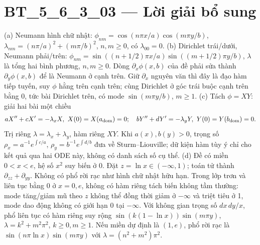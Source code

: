 \documentclass[10pt,a4paper]{article}
\begin{document}
\section*{BT\_5\_6\_3\_03 — Lời giải bổ sung}
(a) Neumann hình chữ nhật: $\phi_{nm}=\cos(n\pi x/a)\cos(m\pi y/b)$, $\lambda_{nm}=(n\pi/a)^2+(m\pi/b)^2$, $n,m\ge0$, có $\lambda_{00}=0$.
(b) Dirichlet trái/dưới, Neumann phải/trên: $\phi_{nm}=\sin((n+1/2)\pi x/a)\sin((m+1/2)\pi y/b)$, $\lambda$ là tổng hai bình phương, $n,m\ge0$. Dòng $\partial_x\phi(x,b)$ của đề phải sửa thành $\partial_y\phi(x,b)$ để là Neumann ở cạnh trên. Giữ $\partial_x$ nguyên văn thì đây là đạo hàm tiếp tuyến, suy $\phi$ hằng trên cạnh trên; cùng Dirichlet ở góc trái buộc cạnh trên bằng 0, tức bài Dirichlet trên, có mode $\sin(m\pi y/b)$, $m\ge1$.
(c) Tách $\phi=XY$: giải hai bài một chiều
\[aX''+cX'=-\lambda_xX,\ X(0)=X(a_{\rm dom})=0;\quad bY''+dY'=-\lambda_yY,\ Y(0)=Y(b_{\rm dom})=0.\]
Trị riêng $\lambda=\lambda_x+\lambda_y$, hàm riêng $XY$. Khi $a(x),b(y)>0$, trọng số $\rho_x=a^{-1}e^{\int c/a}$, $\rho_y=b^{-1}e^{\int d/b}$ đưa về Sturm--Liouville; dữ kiện hàm tùy ý chỉ cho kết quả qua hai ODE này, không có danh sách số cụ thể.
(d) Đề có miền $0<x<e$, hệ số $x^2$ suy biến ở 0. Đặt $z=\ln x\in(-\infty,1)$; toán tử thành $\partial_{zz}+\partial_{yy}$. Không có phổ rời rạc như hình chữ nhật hữu hạn. Trong lớp trơn và liên tục bằng 0 ở $x=0,e$, không có hàm riêng tách biến không tầm thường: mode tăng/giảm mũ theo $z$ không thể đồng thời giảm ở $-\infty$ và triệt tiêu ở 1, mode dao động không có giới hạn 0 tại $-\infty$. Với không gian trọng số $dx\,dy/x$, phổ liên tục có hàm riêng suy rộng $\sin(k(1-\ln x))\sin(m\pi y)$, $\lambda=k^2+m^2\pi^2$, $k\ge0,m\ge1$. Nếu miền dự định là $(1,e)$, phổ rời rạc là $\sin(n\pi\ln x)\sin(m\pi y)$ với $\lambda=(n^2+m^2)\pi^2$.
\end{document}
